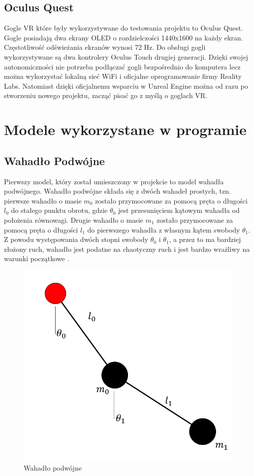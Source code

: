 \documentclass[a4paper,12pt,reqno]{article}
\begin{document}
\subsection{Oculus Quest}

Gogle VR które były wykorzystywane do testowania projektu to Oculus Quest. Gogle posiadają dwa ekrany OLED o rozdzielczości 1440x1600 na każdy ekran. Częstotliwość odświeżania ekranów wynosi 72 Hz. Do obsługi gogli wykorzystywane są dwa kontrolery Oculus Touch drugiej generacji. Dzięki swojej autonomiczności nie potrzeba podłączać gogli bezpośrednio do komputera lecz można wykorzystać lokalną sieć WiFi i oficjalne oprogramowanie firmy Reality Labs. Natomiast dzięki oficjalnemu wsparciu w Unreal Engine można od razu po stworzeniu nowego projektu, zacząć pisać go z myślą o goglach VR.


\section{Modele wykorzystane w programie}

\subsection{Wahadło Podwójne}

Pierwszy model, który został umieszczony w projekcie to model wahadła podwójnego. Wahadło podwójne składa się z dwóch wahadeł prostych, tzn. pierwsze wahadło o masie $m_0$ zostało przymocowane za pomocą pręta o długości $l_0$ do stałego punktu obrotu, gdzie $\theta_0$ jest przesunięciem kątowym wahadła od położenia równowagi. Drugie wahadło o masie $m_1$ zostało przymocowane za pomocą pręta o długości $l_1$ do pierwszego wahadła z własnym kątem swobody $\theta_1$. Z powodu występowania dwóch stopni swobody $\theta_0$ i $\theta_1$, a przez to ma bardziej złożony ruch, wahadło jest podatne na chaotyczny ruch i jest bardzo wrażliwy na warunki początkowe \cite{double_pendulum_book}.

\begin{figure}[H]%
\centering
\includegraphics[width=0.5\columnwidth]{graphics/pendulum/DoublePendulum.png}
\caption{Wahadło podwójne
\label{BPExample}}%
%
\qquad
\end{figure}  
\end{document}
